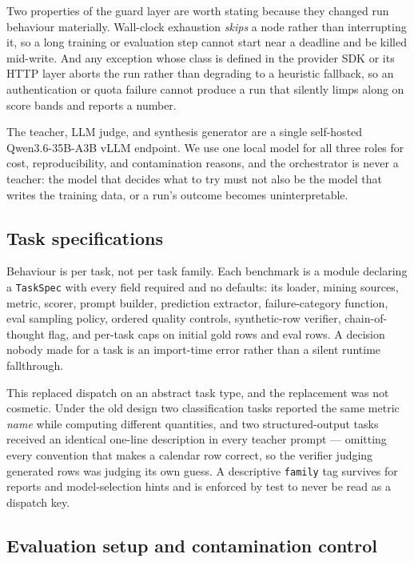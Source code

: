 \documentclass[sigconf,10pt]{acmart}
\begin{document}
Two properties of the guard layer are worth stating because they changed run behaviour
materially. Wall-clock exhaustion \emph{skips} a node rather than interrupting it, so a long
training or evaluation step cannot start near a deadline and be killed mid-write. And any
exception whose class is defined in the provider SDK or its HTTP layer aborts the run rather
than degrading to a heuristic fallback, so an authentication or quota failure cannot produce
a run that silently limps along on score bands and reports a number.

The teacher, LLM judge, and synthesis generator are a single self-hosted
Qwen3.6-35B-A3B vLLM endpoint. We use one local model for all three roles for cost,
reproducibility, and contamination reasons, and the orchestrator is never a teacher: the
model that decides what to try must not also be the model that writes the training data, or
a run's outcome becomes uninterpretable.

\subsection{Task specifications}

Behaviour is per task, not per task family. Each benchmark is a module declaring a
\texttt{TaskSpec} with every field required and no defaults: its loader, mining sources,
metric, scorer, prompt builder, prediction extractor, failure-category function, eval
sampling policy, ordered quality controls, synthetic-row verifier, chain-of-thought flag,
and per-task caps on initial gold rows and eval rows. A decision nobody made for a task is
an import-time error rather than a silent runtime fallthrough.

This replaced dispatch on an abstract task type, and the replacement was not cosmetic. Under
the old design two classification tasks reported the same metric \emph{name} while computing
different quantities, and two structured-output tasks received an identical one-line
description in every teacher prompt --- omitting every convention that makes a calendar row
correct, so the verifier judging generated rows was judging its own guess. A descriptive
\texttt{family} tag survives for reports and model-selection hints and is enforced by test to
never be read as a dispatch key.

\subsection{Evaluation setup and contamination control}
\label{sec:system-eval}
\end{document}

